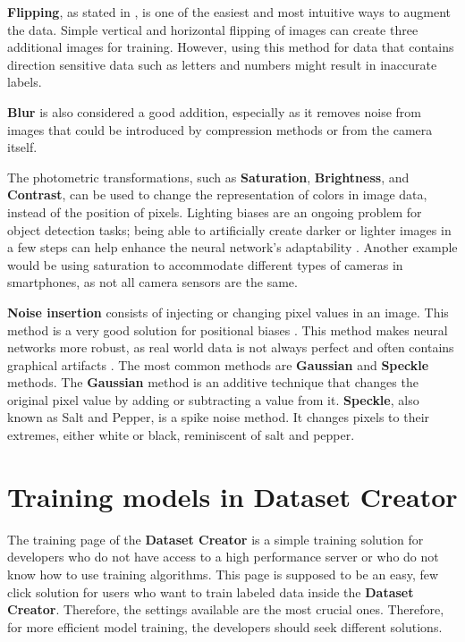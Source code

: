 \textbf{Flipping}, as stated in \cite{dataAugmentation1}, is one of the easiest and most intuitive ways to augment the data. Simple vertical and horizontal flipping of images can create three additional images for training. However, using this method for data that contains direction sensitive \cite{dataAugmentation1} data such as letters and numbers might result in inaccurate labels.

\textbf{Blur} is also considered a good addition, especially as it removes noise from images that could be introduced by compression methods or from the camera itself.

The photometric transformations, such as \textbf{Saturation}, \textbf{Brightness}, and \textbf{Contrast}, can be used to change the representation of colors in image data, instead of the position of pixels. Lighting biases are an ongoing problem for object detection tasks; being able to artificially create darker or lighter images in a few steps can help enhance the neural network's adaptability \cite{dataAugmentation2}. Another example would be using saturation to accommodate different types of cameras in smartphones, as not all camera sensors are the same.

\textbf{Noise insertion} consists of injecting or changing pixel values in an image. This method is a very good solution for positional biases \cite{dataAugmentation2}. This method makes neural networks more robust, as real world data is not always perfect and often contains graphical artifacts \cite{dataAugmentation1}. The most common methods are \textbf{Gaussian} and \textbf{Speckle} methods. The \textbf{Gaussian} method is an additive technique that changes the original pixel value by adding or subtracting a value from it. \textbf{Speckle}, also known as Salt and Pepper, is a spike noise method. It changes pixels to their extremes, either white or black, reminiscent of salt and pepper.





\section{Training models in Dataset Creator}
The training page of the \textbf{Dataset Creator} is a simple training solution for developers who do not have access to a high performance server or who do not know how to use training algorithms. This page is supposed to be an easy, few click solution for users who want to train labeled data inside the \textbf{Dataset Creator}. Therefore, the settings available are the most crucial ones. Therefore, for more efficient model training, the developers should seek different solutions.

